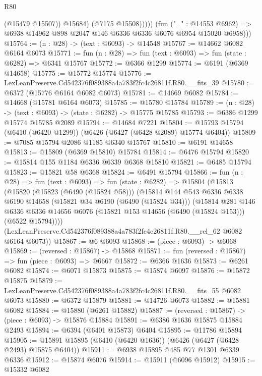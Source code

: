 \begin{lexlean}{R80}
\begin{coremodule}
                    (@15479 @15507))
                  @15684)
                (@7175 @15508)))))
        (fun ("_" : @14553 @6962) =>
        @6938 @14962 @898 @2047 @146 @6336 @6336 @6076 @6954 @15020 @6958)))
@15764 := (n : @28) -> (text : @6093) -> @14548
@15767 := @14662 @6082 @6164 @6073
@15771 := fun (n : @28) => fun (text : @6093) => fun (state : @6282) => @6341 @15767
@15772 := @6366 @1299
@15774 := @6191 (@6369 @14658)
@15775 := @15772 @15774
@15776 := LexLeanPreserve.Cd542376f089388a4a783f2fc4c26811f.R80.__fits_39
@15780 := @6372 (@15776 @6164 @6082 @6073)
@15781 := @14669 @6082
@15784 := @14668 (@15781 @6164 @6073)
@15785 := @15780 @15784
@15789 := (n : @28) -> (text : @6093) -> (state : @6282) -> @15775 @15785
@15793 := @6386 @1299 @15774 @15785 @2089
@15794 := @14684 @7221
@15804 := @15793 @15794 (@6410 (@6420 @1299)) (@6426 (@6427 (@6428 @2089) @15774 @6404))
@15809 := @7085 @15794 @2086 @1185 @6340 @15767
@15810 := @6191 @14658
@15813 := @15809 (@6369 @15810) @15784
@15814 := @6476 @15794
@15820 := @15814 @155 @1184 @6336 @6339 @6368 @15810
@15821 := @6485 @15794
@15823 := @15821 @58 @6368
@15824 := @6491 @15794
@15866 := fun (n : @28) =>
  fun (text : @6093) =>
  fun (state : @6282) =>
  @15804
    (@15813
      (@15820
        (@15823 (@6490 (@15824 @58)))
        (@15814
          @144
          @543
          @6336
          @6338
          @6190
          @14658
          (@15821 @34 @6190 (@6490 (@15824 @34)))
          (@15814
            @281
            @146
            @6336
            @6336
            @14656
            @6076
            (@15821 @153 @14656 (@6490 (@15824 @153)))
            (@6522 @15794))))
      (LexLeanPreserve.Cd542376f089388a4a783f2fc4c26811f.R80.__rel_62 @6082 @6164 @6073))
@15867 := @6 @6093
@15868 := (piece : @6093) -> @6068
@15869 := (reversed : @15867) -> @15868
@15871 := fun (reversed : @15867) => fun (piece : @6093) => @6667
@15872 := @6366 @1636
@15873 := @6261 @6082
@15874 := @6071 @15873
@15875 := @15874 @6097
@15876 := @15872 @15875
@15879 := LexLeanPreserve.Cd542376f089388a4a783f2fc4c26811f.R80.__fits_55 @6082 @6073
@15880 := @6372 @15879
@15881 := @14726 @6073
@15882 := @15881 @6082
@15884 := @15880 (@6261 @15882)
@15887 := (reversed : @15867) -> (piece : @6093) -> @15876 @15884
@15891 := @6386 @1636 @15875 @15884 @2493
@15894 := @6394 (@6401 @15873) @6404
@15895 := @11786 @15894
@15905 := @15891 @15895 (@6410 (@6420 @1636)) (@6426 (@6427 (@6428 @2493) @15875 @6404))
@15911 := @6938 @15895 @485 @77 @1301 @6339 @6336
@15912 := @15874 @6076
@15914 := @15911 (@6096 @15912)
@15915 := @15332 @6082

\end{coremodule}
\end{lexlean}
